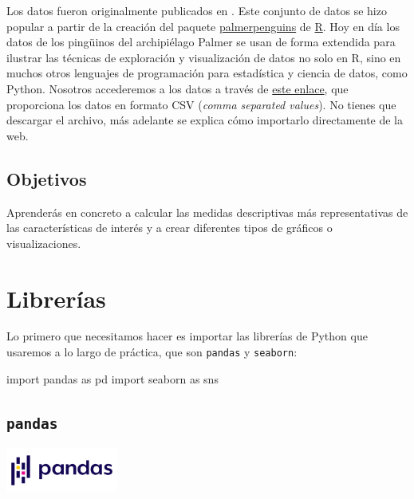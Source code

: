 \documentclass[
  a4paper,
  noprof,
  12pt,
  notoc,
  nosols,
  nobib]{mnye}
\newenvironment{Shaded}{\begin{snugshade}}{\end{snugshade}}
\newcommand{\ImportTok}[1]{\textcolor[rgb]{0.00,0.46,0.62}{#1}}
\newcommand{\NormalTok}[1]{\textcolor[rgb]{0.00,0.23,0.31}{#1}}
\theoremstyle{definition}
\theoremstyle{remark}
\begin{document}
Los datos fueron originalmente publicados en \textcite{Gorman2014}. Este
conjunto de datos se hizo popular a partir de la creación del paquete
\href{https://github.com/allisonhorst/palmerpenguins}{palmerpenguins} de
\href{https://www.r-project.org/}{R}. Hoy en día los datos de los
pingüinos del archipiélago Palmer se usan de forma extendida para
ilustrar las técnicas de exploración y visualización de datos no solo en
R, sino en muchos otros lenguajes de programación para estadística y
ciencia de datos, como Python. Nosotros accederemos a los datos a través
de
\href{https://github.com/mwaskom/seaborn-data/blob/master/penguins.csv}{este
enlace}, que proporciona los datos en formato CSV (\emph{comma separated
values}). No tienes que descargar el archivo, más adelante se explica
cómo importarlo directamente de la web.

\subsection*{Objetivos}\label{objetivos}


Aprenderás en concreto a calcular las medidas descriptivas más
representativas de las características de interés y a crear diferentes
tipos de gráficos o visualizaciones.


\section{Librerías}\label{libreruxedas}

Lo primero que necesitamos hacer es importar las librerías de Python que
usaremos a lo largo de práctica, que son \texttt{pandas} y
\texttt{seaborn}:

\begin{Shaded}
\begin{Highlighting}[]
\ImportTok{import}\NormalTok{ pandas }\ImportTok{as}\NormalTok{ pd}
\ImportTok{import}\NormalTok{ seaborn }\ImportTok{as}\NormalTok{ sns}
\end{Highlighting}
\end{Shaded}

\subsection{\texorpdfstring{\texttt{pandas}}{pandas}}\label{pandas}

\begin{center}
\includegraphics[width=\textwidth,height=4em]{chapters/../img/pandas.png}
\end{center}
\end{document}
